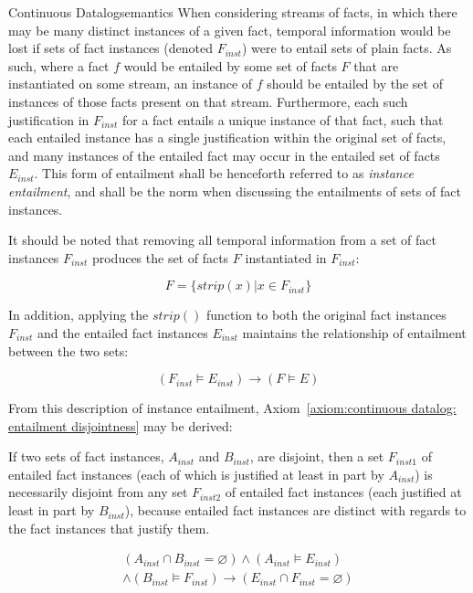 \begin{nestedsection}{Continuous Datalog}{semantics}
When considering streams of facts, in which there may be many distinct
instances of a given fact, temporal information would be lost if sets
of fact instances (denoted $F_{inst}$) were to entail sets of plain
facts.  As such, where a fact $f$ would be entailed by some set of
facts $F$ that are instantiated on some stream, an instance of $f$
should be entailed by the set of instances of those facts present on
that stream.  Furthermore, each such justification in $F_{inst}$ for a
fact entails a unique instance of that fact, such that each entailed
instance has a single justification within the original set of facts,
and many instances of the entailed fact may occur in the entailed set
of facts $E_{inst}$.  This form of entailment shall be henceforth
referred to as {\em instance entailment}, and shall be the norm when
discussing the entailments of sets of fact instances.
	
It should be noted that removing all temporal information from a set
of fact instances $F_{inst}$ produces the set of facts $F$
instantiated in $F_{inst}$:

\[F = \{ strip(x) | x \in F_{inst} \}\]

In addition, applying the ${strip()}$ function to both the original
fact instances $F_{inst}$ and the entailed fact instances $E_{inst}$
maintains the relationship of entailment between the two sets:

\[ \left( F_{inst} \vDash E_{inst} \right) \rightarrow \left( F \vDash E \right) \]

From this description of instance entailment,
Axiom~\ref{axiom:continuous datalog: entailment disjointness} may be
derived:

\begin{axiom}
\label{axiom:continuous datalog: entailment disjointness}

If two sets of fact instances, $A_{inst}$ and $B_{inst}$, are
disjoint, then a set $F_{inst1}$ of entailed fact instances (each of
which is justified at least in part by $A_{inst}$) is necessarily
disjoint from any set $F_{inst2}$ of entailed fact instances (each
justified at least in part by $B_{inst}$), because entailed fact
instances are distinct with regards to the fact instances that justify
them.

\begin{multline*}
\left( A_{inst} \cap B_{inst} = \varnothing \right) \wedge \left( A_{inst} \vDash E_{inst} \right) \\
\wedge \left( B_{inst} \vDash F_{inst} \right) \rightarrow \left( E_{inst} \cap F_{inst} = \varnothing \right)
\end{multline*}
\end{axiom}


\end{nestedsection}
